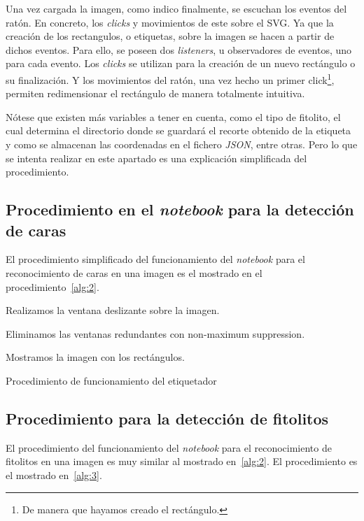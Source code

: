 Una vez cargada la imagen, como indico finalmente, se escuchan los eventos del ratón. En concreto, los \textit{clicks} y movimientos de este sobre el SVG. Ya que la creación de los rectangulos, o etiquetas, sobre la imagen se hacen a partir de dichos eventos. Para ello, se poseen dos \textit{listeners}, u observadores de eventos, uno para cada evento. Los \textit{clicks} se utilizan para la creación de un nuevo rectángulo o su finalización. Y los movimientos del ratón, una vez hecho un primer click\footnote{De manera que hayamos creado el rectángulo.}, permiten redimensionar el rectángulo de manera totalmente intuitiva.

Nótese que existen más variables a tener en cuenta, como el tipo de fitolito, el cual determina el directorio donde se guardará el recorte obtenido de la etiqueta y como se almacenan las coordenadas en el fichero \textit{JSON}, entre otras. Pero lo que se intenta realizar en este apartado es una explicación simplificada del procedimiento.

\subsection{Procedimiento en el \textit{notebook} para la detección de caras}

El procedimiento simplificado del funcionamiento del \textit{notebook} para el reconocimiento de caras en una imagen es el mostrado en el procedimiento~\ref{alg:2}.

\begin{algorithm}
    Realizamos la ventana deslizante sobre la imagen.    
    
    
    Eliminamos las ventanas redundantes con non-maximum suppression.

    Mostramos la imagen con los rectángulos.
    \caption{Procedimiento de funcionamiento del etiquetador}
    \label{alg:2}
\end{algorithm}

\subsection{Procedimiento para la detección de fitolitos}

El procedimiento del funcionamiento del \textit{notebook} para el reconocimiento de fitolitos en una imagen es muy similar al mostrado en~\ref{alg:2}. El procedimiento es el mostrado en~\ref{alg:3}.

